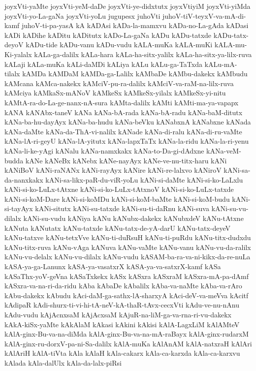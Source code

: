 {joyxVti-yaMte
joyxVti-yeM-daDe
joyxVti-ye-didxtutx
joyxVtiyiM
joyxVti-yiMda
joyxVti-yo-La-gaNa
joyxVti-yoLu
jugupesx
juhoVti
juhoV-tiV-teyxV-va-mA-di-kamf
juhoV-ti-pa-yasA
kA
kADAsi
kADa-la-mamxvu
kADa-no-La-gAda
kADasi
kADi
kADihe
kADitu
kADitutx
kADo-La-gaNa
kADu
kADu-tatxde
kADu-tatx-deyoV
kADu-tide
kADu-vanu
kADu-vudu
kALA-muKa
kALA-muKi
kALA-mu-Ki-yalalx
kALa-ga-dalilx
kALa-hara
kALa-ha-sitx-yalilx
kALa-ha-sitx-ya-lilx-ruva
kALaji
kALa-muKa
kALi-daMDi
kALiya
kALu
kALu-ga-TaTxda
kALu-mA-tilalx
kAMDa
kAMDaM
kAMDa-ga-Lalilx
kAMbaDe
kAMbu-dakekx
kAMbudu
kAMcana
kAMca-nakekx
kAMciV-pu-ra-dalilx
kAMciV-va-raM-na-lilx-ruva
kAMciya
kAMkaSx-mANoV
kAMkeSx
kAMkeSx-yilalx
kAMkeSx-yi-nitu
kAMtA-ra-do-La-ge-nanx-nA-sura
kAMta-dalilx
kAMti
kAMti-ma-ya-vapapx
kANA
kANAbx-taneV
kANa
kANa-bA-rada
kANa-bA-radu
kANa-baM-ditutx
kANa-ba-hu-dayAyx
kANa-ba-hudu
kANa-beVku
kANabxnA
kANabxne
kANada
kANa-daMte
kANa-da-ThA-vi-nalilx
kANade
kANa-di-ralu
kANa-di-ru-vaMte
kANa-lA-ri-geyU
kANa-lA-yitutx
kANa-lapxTaTx
kANa-la-ridu
kANa-la-ri-yenu
kANa-li-ke-yAgi
kANalu
kANa-namxkakx
kANa-to-Da-gi-dAdxne
kANa-veM-budda
kANe
kANeBx
kANebx
kANe-nayAyx
kANe-ve-nu-titx-haru
kANi
kANiBoV
kANi-raNANx
kANi-rayAyx
kANire
kANi-re-lalxvo
kANiroV
kANi-sa-da-nanxkakx
kANi-sa-likx-paR-du-viR-yoLu
kANi-si-daMte
kANi-si-ko-LaLxlu
kANi-si-ko-LuLx-tAtxne
kANi-si-ko-LuLx-tAtxnoV
kANi-si-ko-LuLx-tatxde
kANi-si-koM-Dare
kANi-si-koMDu
kANi-si-koM-baMte
kANi-si-koM-budu
kANi-si-tayAyx
kANi-situtx
kANi-su-tatxde
kANi-su-ti-daRnu
kANi-suva
kANi-su-vu-dilalx
kANi-su-vudu
kANiya
kANu
kANubx-dakekx
kANubxdeV
kANu-tAtxne
kANuta
kANutatx
kANu-tatxde
kANu-tatx-de-yA-darU
kANu-tatx-deyeV
kANu-tatxve
kANu-tetxVve
kANu-ti-duRsuH
kANu-ti-puRdu
kANu-titx-dudxdu
kANu-titx-ruva
kANu-vAga
kANuva
kANu-vaMte
kANu-vanu
kANu-vu-da-ralilx
kANu-vu-delalx
kANu-vu-dilalx
kANu-vudu
kASAM-ba-ra-va-ni-kikx-da-re-nuLa
kASA-ya-ga-Lanunx
kASA-ya-vasatxrX
kASA-ya-va-satxrX-kamf
kASa
kASaThx-yoV-geVna
kASaTxkekx
kASx
kASxra
kASxraM
kASxra-mA-pa-dAmf
kASxra-va-na-ri-da-ridu
kAba
kAbaDe
kAbalilx
kAba-va-naMte
kAba-va-rAro
kAbu-dakekx
kAbudu
kAci-daM-ga-sathx-lA-sharxyA
kAci-deV-va-meVva
kAcitf
kAdipaR
kAdi-shurx-ti-vi-hi-tA-neV-kA-thaR-tAvx-cecxVti
kAdu-ve-nu-nAnu
kAdu-vudu
kAjAcnxsaM
kAjAcxsaM
kAjuR-na-liM-ga-va-rna-ri-vu-dakekx
kAkA-kiSx-yaMte
kAkAlaM
kAkasi
kAkini
kAkisi
kAlA-LagxLiM
kAlAMteV
kAlA-ginx-Bu-va-na-diMda
kAlA-ginx-Bu-va-na-mA-raBayx
kAlA-ginx-rudarxM
kAlA-ginx-ru-dorxV-pa-ni-Sa-dalilx
kAlA-muKa
kAlAnAM
kAlA-natxraH
kAlAri
kAlAriH
kAlA-tiVta
kAla
kAlaH
kAla-cakarx
kAla-ca-karxda
kAla-ca-karxvu
kAlada
kAla-dalUlx
kAla-da-lalx-piRsi
}
